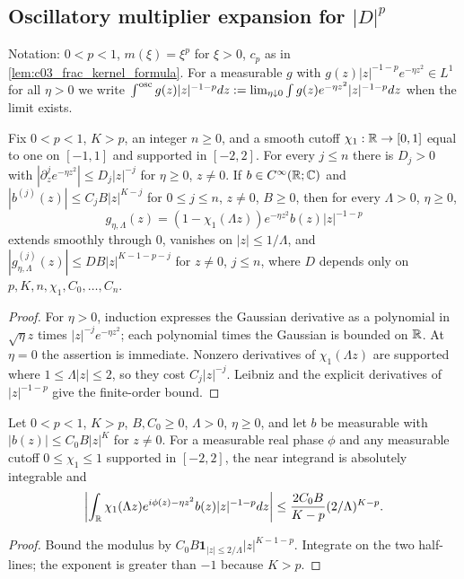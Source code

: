 \subsection{Oscillatory multiplier expansion for $|D|^p$}

Notation: $0<p<1$, $m(\xi)=\xi^p$ for $\xi>0$, $c_p$ as in \cref{lem:c03_frac_kernel_formula}. For a measurable $g$ with $g(z)|z|^{-1-p}e^{-\eta z^2}\in L^1$ for all $\eta>0$ we write $\int^{\textup{osc}}g(z)|z|^{-1-p}dz:=\lim_{\eta\downarrow0}\int g(z)e^{-\eta z^2}|z|^{-1-p}dz$ when the limit exists.

\begin{lemma}
  \label{lem:c03_homogeneous_cutoff_symbol}
  Fix $0<p<1$, $K>p$, an integer $n\ge0$, and a smooth cutoff
  $\chi_1:\mathbb{R}\to[0,1]$ equal to one on $[-1,1]$ and supported in $[-2,2]$.
  For every $j\le n$ there is $D_j>0$ with
  $|\partial_z^j e^{-\eta z^2}|\le D_j|z|^{-j}$ for $\eta\ge0$, $z\ne0$.
  If $b\in C^\infty(\mathbb{R};\mathbb{C})$ and $|b^{(j)}(z)|\le C_j B|z|^{K-j}$ for
  $0\le j\le n$, $z\ne0$, $B\ge0$, then for every $\Lambda>0$, $\eta\ge0$,
  \[
    g_{\eta,\Lambda}(z)=(1-\chi_1(\Lambda z))e^{-\eta z^2}b(z)|z|^{-1-p}
  \]
  extends smoothly through $0$, vanishes on $|z|\le1/\Lambda$, and
  $|g_{\eta,\Lambda}^{(j)}(z)|\le D B|z|^{K-1-p-j}$ for $z\ne0$, $j\le n$,
  where $D$ depends only on $p,K,n,\chi_1,C_0,\ldots,C_n$.
\end{lemma}
\begin{proof}
  For $\eta>0$, induction expresses the Gaussian derivative as a polynomial in $\sqrt\eta z$
  times $|z|^{-j}e^{-\eta z^2}$; each polynomial times the Gaussian is bounded on $\mathbb{R}$.
  At $\eta=0$ the assertion is immediate. Nonzero derivatives of $\chi_1(\Lambda z)$ are
  supported where $1\le\Lambda|z|\le2$, so they cost $C_j|z|^{-j}$.
  Leibniz and the explicit derivatives of $|z|^{-1-p}$ give the finite-order bound.
\end{proof}

\begin{lemma}
  \label{lem:c03_homogeneous_near}
  Let $0<p<1$, $K>p$, $B,C_0\ge0$, $\Lambda>0$, $\eta\ge0$, and let
  $b$ be measurable with $|b(z)|\le C_0B|z|^K$ for $z\ne0$.
  For a measurable real phase $\phi$ and any measurable cutoff $0\le\chi_1\le1$
  supported in $[-2,2]$, the near integrand is absolutely integrable and
  \[
    \left|\int_{\mathbb{R}}\chi_1(\Lambda z)e^{i\phi(z)-\eta z^2}b(z)|z|^{-1-p}dz\right|
      \le\frac{2C_0B}{K-p}(2/\Lambda)^{K-p}.
  \]
\end{lemma}
\begin{proof}
  Bound the modulus by $C_0B\mathbf1_{|z|\le2/\Lambda}|z|^{K-1-p}$.
  Integrate on the two half-lines; the exponent is greater than $-1$ because $K>p$.
\end{proof}

